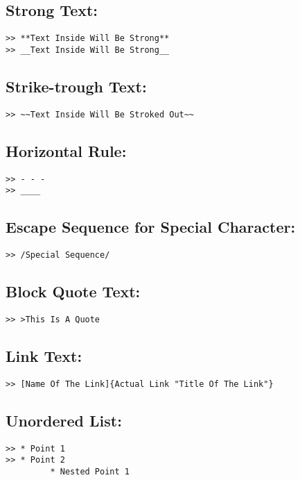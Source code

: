\documentclass[12pt,british]{article}
\begin{document}
\subsection{Strong Text:}
\begin{verbatim}
>> **Text Inside Will Be Strong**
>> __Text Inside Will Be Strong__
\end{verbatim}

\subsection{Strike-trough Text:}
\begin{verbatim}
>> ~~Text Inside Will Be Stroked Out~~
\end{verbatim}

\subsection{Horizontal Rule:}
\begin{verbatim}
>> - - -
>> ____
\end{verbatim}

\subsection{Escape Sequence for Special Character:}
\begin{verbatim}
>> /Special Sequence/
\end{verbatim}

\subsection{Block Quote Text:}
\begin{verbatim}
>> >This Is A Quote
\end{verbatim}

\subsection{Link Text:}
\begin{verbatim}
>> [Name Of The Link]{Actual Link "Title Of The Link"}
\end{verbatim}

\subsection{Unordered List:}
\begin{verbatim}
>> * Point 1
>> * Point 2
         * Nested Point 1
\end{verbatim}
\end{document}
